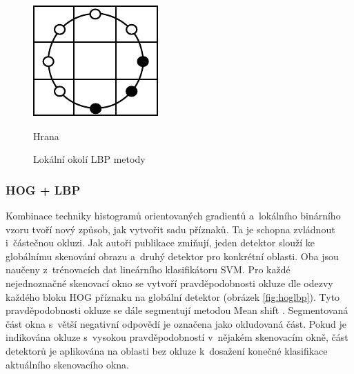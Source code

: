 \begin{figure}[H]
\begin{minipage}[b]{.18\textwidth}
  \includegraphics[width=.9\linewidth]{figures/lbp_edge}
  \caption*{Hrana}
\end{minipage}
\caption{Lokální okolí LBP metody \cite{lbp:orig}}
\label{fig:lbpvzory}
\end{figure}

\subsubsection*{HOG + LBP}
Kombinace techniky histogramů orientovaných gradientů a~lokálního binárního vzoru tvoří nový způsob, jak vytvořit sadu příznaků. Ta je schopna zvládnout i~částečnou okluzi. Jak autoři publikace \cite{hoglpb} zmiňují, jeden detektor slouží ke globálnímu skenování obrazu a~druhý detektor pro konkrétní oblasti. Oba jsou naučeny z~trénovacích dat lineárního klasifikátoru SVM. Pro každé nejednoznačné skenovací okno se vytvoří pravděpodobnosti okluze dle odezvy každého bloku HOG příznaku na globální detektor (obrázek \ref{fig:hoglbp}). Tyto pravděpodobnosti okluze se dále segmentují metodou Mean shift \cite{meanshift1, meanshift2}. Segmentovaná část okna s~větší negativní odpovědí je označena jako okludovaná část. Pokud je indikována okluze s~vysokou pravděpodobností v~nějakém skenovacím okně, část detektorů je aplikována na oblasti bez okluze k~dosažení konečné klasifikace aktuálního skenovacího okna. 

